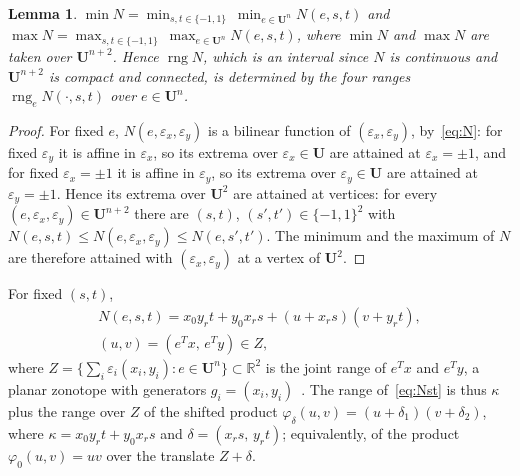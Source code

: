 \documentclass[10pt]{article}
\newtheorem{lemma}{Lemma}
\theoremstyle{definition}
\newcommand{\U}{\mathbf{U}}
\newcommand{\R}{\mathbb{R}}
\newcommand{\eps}{\varepsilon}
\newcommand{\ex}{\eps_x}
\newcommand{\ey}{\eps_y}
\newcommand{\rng}{\operatorname{rng}}
\begin{document}
\begin{lemma}
\label{lem:vertices}
$\min N = \min_{s,t\in\{-1,1\}}\ \min_{e\in\U^n} N(e,s,t)$ and $\max N = \max_{s,t\in\{-1,1\}}\ \max_{e\in\U^n} N(e,s,t)$, where $\min N$ and $\max N$ are taken over $\U^{n+2}$. Hence $\rng N$, which is an interval since $N$ is continuous and $\U^{n+2}$ is compact and connected, is determined by the four ranges $\rng_e N(\cdot,s,t)$ over $e\in\U^n$.
\end{lemma}
\begin{proof}
For fixed $e$, $N(e,\ex,\ey)$ is a bilinear function of $(\ex,\ey)$, by~\eqref{eq:N}: for fixed $\ey$ it is affine in $\ex$, so its extrema over $\ex\in\U$ are attained at $\ex=\pm1$, and for fixed $\ex=\pm1$ it is affine in $\ey$, so its extrema over $\ey\in\U$ are attained at $\ey=\pm1$. Hence its extrema over $\U^2$ are attained at vertices: for every $(e,\ex,\ey)\in\U^{n+2}$ there are $(s,t)$, $(s',t')\in\{-1,1\}^2$ with $N(e,s,t)\le N(e,\ex,\ey)\le N(e,s',t')$. The minimum and the maximum of $N$ are therefore attained with $(\ex,\ey)$ at a vertex of $\U^2$.
\end{proof}

For fixed $(s,t)$,
\begin{equation}
\label{eq:Nst}
\begin{gathered}N(e,s,t) = x_0y_rt+y_0x_rs + (u + x_rs)(v + y_rt),\\ (u,v)=(e^Tx,\,e^Ty)\in Z,\end{gathered}
\end{equation}
where $Z=\{\sum_i\eps_i(x_i,y_i): e\in\U^n\}\subset\R^2$ is the joint range of $e^Tx$ and $e^Ty$, a planar zonotope with generators $g_i=(x_i,y_i)$~\cite{ziegler1995lectures}. The range of~\eqref{eq:Nst} is thus $\kappa$ plus the range over $Z$ of the shifted product $\varphi_\delta(u,v)=(u+\delta_1)(v+\delta_2)$, where $\kappa=x_0y_rt+y_0x_rs$ and $\delta=(x_rs,\,y_rt)$; equivalently, of the product $\varphi_0(u,v)=uv$ over the translate $Z+\delta$.
\end{document}
